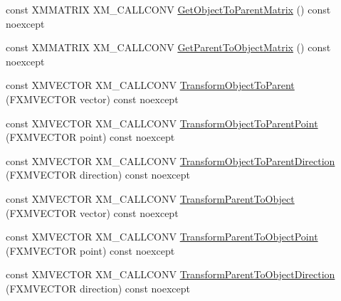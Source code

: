 \begin{DoxyCompactItemize}
\item 
const X\+M\+M\+A\+T\+R\+IX X\+M\+\_\+\+C\+A\+L\+L\+C\+O\+NV \hyperlink{classmage_1_1_local_transform_aaf08dbe2fd5125b11e61fc052911dbb6}{Get\+Object\+To\+Parent\+Matrix} () const noexcept
\item 
const X\+M\+M\+A\+T\+R\+IX X\+M\+\_\+\+C\+A\+L\+L\+C\+O\+NV \hyperlink{classmage_1_1_local_transform_a3cc177e24cac45b28231943f7e7d7b03}{Get\+Parent\+To\+Object\+Matrix} () const noexcept
\item 
const X\+M\+V\+E\+C\+T\+OR X\+M\+\_\+\+C\+A\+L\+L\+C\+O\+NV \hyperlink{classmage_1_1_local_transform_abfd5e324acb96d0dc9b3a1a84b0403d9}{Transform\+Object\+To\+Parent} (F\+X\+M\+V\+E\+C\+T\+OR vector) const noexcept
\item 
const X\+M\+V\+E\+C\+T\+OR X\+M\+\_\+\+C\+A\+L\+L\+C\+O\+NV \hyperlink{classmage_1_1_local_transform_a5df12629f26c4bf4d95728333d415d53}{Transform\+Object\+To\+Parent\+Point} (F\+X\+M\+V\+E\+C\+T\+OR point) const noexcept
\item 
const X\+M\+V\+E\+C\+T\+OR X\+M\+\_\+\+C\+A\+L\+L\+C\+O\+NV \hyperlink{classmage_1_1_local_transform_a270150142e83d91a694d6d621b09c1ad}{Transform\+Object\+To\+Parent\+Direction} (F\+X\+M\+V\+E\+C\+T\+OR direction) const noexcept
\item 
const X\+M\+V\+E\+C\+T\+OR X\+M\+\_\+\+C\+A\+L\+L\+C\+O\+NV \hyperlink{classmage_1_1_local_transform_aee4c8c7b54e538a1448224bb36490d0a}{Transform\+Parent\+To\+Object} (F\+X\+M\+V\+E\+C\+T\+OR vector) const noexcept
\item 
const X\+M\+V\+E\+C\+T\+OR X\+M\+\_\+\+C\+A\+L\+L\+C\+O\+NV \hyperlink{classmage_1_1_local_transform_a869e0acb9947f74405bad09164182373}{Transform\+Parent\+To\+Object\+Point} (F\+X\+M\+V\+E\+C\+T\+OR point) const noexcept
\item 
const X\+M\+V\+E\+C\+T\+OR X\+M\+\_\+\+C\+A\+L\+L\+C\+O\+NV \hyperlink{classmage_1_1_local_transform_a237b0811672ffc8dd611e6a56af24c18}{Transform\+Parent\+To\+Object\+Direction} (F\+X\+M\+V\+E\+C\+T\+OR direction) const noexcept
\end{DoxyCompactItemize}

